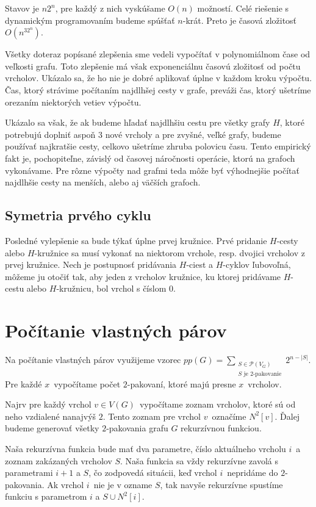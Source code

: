 Stavov je $n2^n$, pre každý z nich vyskúšame $O(n)$ možností. Celé riešenie s dynamickým
programovaním budeme spúšťať $n$-krát. Preto je časová zložitosť $O(n^32^n)$.

Všetky doteraz popísané zlepšenia sme vedeli vypočítať v polynomiálnom čase od veľkosti grafu.
Toto zlepšenie má však exponenciálnu časovú zložitosť od počtu vrcholov. Ukázalo sa,
že ho nie je dobré aplikovať úplne v každom kroku výpočtu. Čas, ktorý strávime počítaním
najdlhšej cesty v grafe, preváži čas, ktorý ušetríme orezaním niektorých vetiev výpočtu.

Ukázalo sa však, že ak budeme hľadať najdlhšiu cestu pre všetky grafy $H$, ktoré potrebujú
doplniť aspoň $3$ nové vrcholy a pre zvyšné, veľké grafy, budeme používať najkratšie cesty,
celkovo ušetríme zhruba polovicu času. Tento empirický fakt je, pochopiteľne, závislý od
časovej náročnosti operácie, ktorú na grafoch vykonávame. Pre rôzne výpočty nad grafmi
teda môže byť výhodnejšie počítať najdlhšie cesty na menších, alebo aj väčších grafoch.

\subsection{Symetria prvého cyklu}

Posledné vylepšenie sa bude týkať úplne prvej kružnice. Prvé pridanie $H$-cesty alebo $H$-kružnice
sa musí vykonať na niektorom vrchole, resp. dvojici vrcholov z prvej kružnice.
Nech je postupnosť pridávania $H$-ciest a $H$-cyklov ľubovoľná, môžeme ju otočiť tak, aby jeden
z vrcholov kružnice, ku ktorej pridávame $H$-cestu alebo $H$-kružnicu,
bol vrchol s číslom $0$.

\section{Počítanie vlastných párov}

Na počítanie vlastných párov využijeme vzorec $pp(G) = \sum \limits_{\substack{S \in \mathcal{P}(V_G) \\ S \textrm{ je } 2 \textrm{-pakovanie}}} 2^{n - |S|}$.
Pre každé $x$ vypočítame počet $2$-pakovaní, ktoré majú presne $x$ vrcholov.

Najrv pre každý vrchol $v \in V(G)$ vypočítame zoznam vrcholov, ktoré sú od neho vzdialené
nanajvýš $2$. Tento zoznam pre vrchol $v$ označíme $N^2[v]$.
Ďalej budeme generovať všetky $2$-pakovania grafu $G$ rekurzívnou funkciou.

Naša rekurzívna funkcia bude mať dva parametre, číslo aktuálneho vrcholu $i$ a zoznam zakázaných
vrcholov $S$. Naša funkcia sa vždy rekurzívne zavolá s parametrami $i+1$ a $S$, čo zodpovedá
situácii, keď vrchol $i$ nepridáme do $2$-pakovania. Ak vrchol $i$ nie je v ozname $S$, tak
navyše rekurzívne spustíme funkciu s parametrom $i$ a $S \cup N^2[i]$.

